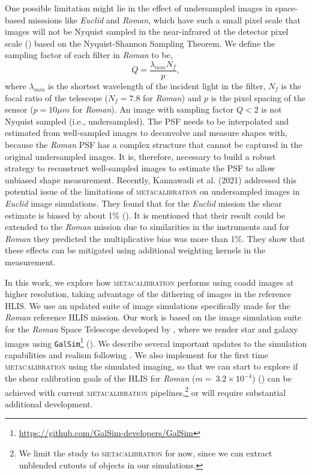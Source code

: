 \documentclass[fleqn,usenatbib]{mnras}
\begin{document}
One possible limitation might lie in the effect of undersampled images in space-based misssions like \emph{Euclid} and \emph{Roman}, which have such a small pixel scale that images will not be Nyquist sampled in the near-infrared at the detector pixel scale (\citealt{2013PASP..125.1496S}) based on the Nyquist-Shannon Sampling Theorem. We define the sampling factor of each filter in \emph{Roman} to be, 
\begin{equation}
    Q = \frac{\lambda_{min}N_{f}}{p}, 
    \label{eqn:sampling}
\end{equation}
where $\lambda_{min}$ is the shortest wavelength of the incident light in the filter, $N_{f}$ is the focal ratio of the telescope ($N_{f}=7.8$ for \emph{Roman}) and $p$ is the pixel spacing of the sensor ($p=10\mu m$ for \emph{Roman}). An image with sampling factor $Q < 2$ is not Nyquist sampled (i.e., undersampled). The PSF needs to be interpolated and estimated from well-sampled images to deconvolve and measure shapes with, because the \emph{Roman} PSF has a complex structure that cannot be captured in the original undersampled images. It is, therefore, necessary to build a robust strategy to reconstruct well-sampled images to estimate the PSF to allow unbiased shape measurement.
Recently, Kannawadi et al. (2021) addressed this potential issue of the limitations of \textsc{metacalibration} on undersampled images in \emph{Euclid} image simulations. They found that for the \emph{Euclid} mission the shear estimate is biased by about 1$\%$ (\citealt{2021MNRAS.502.4048K}). It is mentioned that their result could be extended to the \emph{Roman} mission due to similarities in the instruments and for \emph{Roman} they predicted the multiplicative bias was more than 1\%. They show that these effects can be mitigated using additional weighting kernels in the measurement. 

In this work, we explore how \textsc{metacalibration} performs using coadd images at higher resolution, taking advantage of the dithering of images in the reference HLIS. We use an updated suite of image simulations specifically made for the \emph{Roman} reference HLIS mission. Our work is based on the image simulation suite for the \emph{Roman} Space Telescope developed by \citet{2021MNRAS.501.2044T}, where we render star and galaxy images using \texttt{GalSim}\footnote{\url{ https://github.com/GalSim-developers/GalSim}} (\citealt{2015A&C....10..121R}). We describe several important updates to the simulation capabilities and realism following \cite{2021MNRAS.501.2044T}. We also implement for the first time \textsc{metacalibration} using the simulated imaging, so that we can start to explore if the shear calibration goals of the HLIS for \emph{Roman} ($m=~3.2\times10^{-4}$) (\citealt{2018arXiv180403628D}) can be achieved with current \textsc{metacalibration} pipelines,\footnote{We limit the study to \textsc{metacalibration} for now, since we can extract unblended cutouts of objects in our simulations.} or will require substantial additional development. \par
\end{document}
